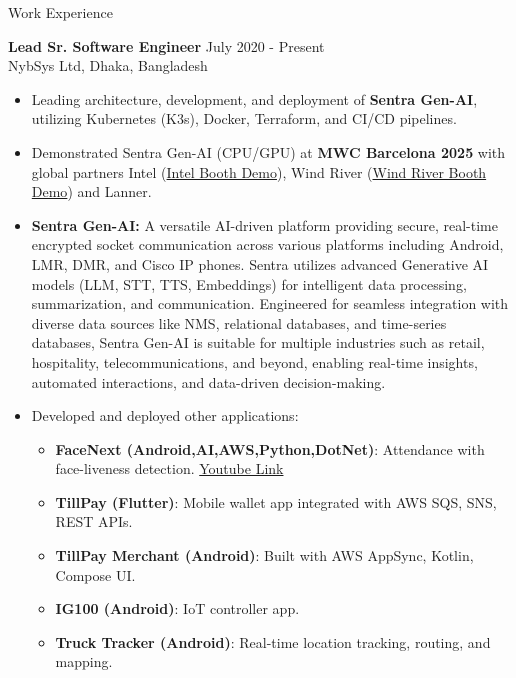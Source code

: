 \documentclass{resume}
\begin{document}
    \begin{rSection}{Work Experience}

    {\bf Lead Sr. Software Engineer} \hfill July 2020 - Present\\
    NybSys Ltd, Dhaka, Bangladesh
    \begin{itemize}
        \itemsep -2pt
        \item Leading architecture, development, and deployment of \textbf{Sentra Gen-AI}, utilizing Kubernetes (K3s), Docker, Terraform, and CI/CD pipelines.
        \item Demonstrated Sentra Gen-AI (CPU/GPU) at \textbf{MWC Barcelona 2025} with global partners Intel (\href{https://www.youtube.com/watch?v=c-kq6M8Or5Q}{Intel Booth Demo}), Wind River (\href{https://www.youtube.com/watch?v=7MGbi-pOHqI}{Wind River Booth Demo}) and Lanner.
        \item \textbf{Sentra Gen-AI:} A versatile AI-driven platform providing secure, real-time encrypted socket communication across various platforms including Android, LMR, DMR, and Cisco IP phones. Sentra utilizes advanced Generative AI models (LLM, STT, TTS, Embeddings) for intelligent data processing, summarization, and communication. Engineered for seamless integration with diverse data sources like NMS, relational databases, and time-series databases, Sentra Gen-AI is suitable for multiple industries such as retail, hospitality, telecommunications, and beyond, enabling real-time insights, automated interactions, and data-driven decision-making.
        \item Developed and deployed other applications:
        \begin{itemize}
            \item \textbf{FaceNext (Android,AI,AWS,Python,DotNet)}: Attendance with face-liveness detection. \href{https://www.youtube.com/watch?v=uF53KBHzpME}{Youtube Link}
            \item \textbf{TillPay (Flutter)}: Mobile wallet app integrated with AWS SQS, SNS, REST APIs.
            \item \textbf{TillPay Merchant (Android)}: Built with AWS AppSync, Kotlin, Compose UI.
            \item \textbf{IG100 (Android)}: IoT controller app.
            \item \textbf{Truck Tracker (Android)}: Real-time location tracking, routing, and mapping.

\end{itemize}
\end{itemize}
\end{rSection}
\end{document}
